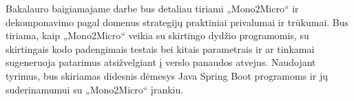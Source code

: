 \documentclass[fleqn]{VUMIFPSkursinis}
\begin{document}
Bakalauro baigiamajame darbe bus detaliau tiriami „Mono2Micro“ ir dekomponavimo pagal domenus strategijų praktiniai privalumai ir trūkumai. Bus tiriama, kaip „Mono2Micro“ veikia su skirtingo dydžio programomis, su skirtingais kodo padengimais testais bei kitais parametrais ir ar tinkamai sugeneruoja patarimus atsižvelgiant į verslo panaudos atvejus. Naudojant tyrimus, bus skiriamas didesnis dėmesys Java Spring Boot programoms ir jų suderinamumui su „Mono2Micro“ įrankiu.

\printbibliography  %
\end{document}
